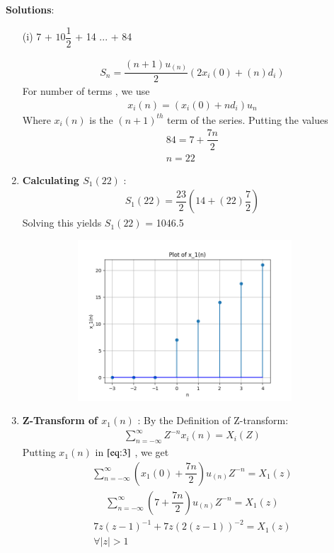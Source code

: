 \documentclass[journal,12pt,twocolumn]{IEEEtran}
\theoremstyle{remark}
\begin{document}
\vspace{0.5cm}
\textbf{Solutions}:
\begin{enumerate}
\item[(i)]   
7 + $10\dfrac{1}{2}$ + 14 ... + 84
\vspace{0.2cm}

\begin{align}
{S_n} = \dfrac{(n+1)u_{(n)}}{2}(2x_i(0) + (n)d_i)\label{eq:1}
\end{align}
For number of terms , we use
\begin{align}
x_i(n) = (x_i(0) + nd_i)u_n\label{eq:2}
\end{align}
Where $x_i(n)$ is the $(n+1)^{th}$ term of the series. Putting the values
\begin{align}  
84 = 7+\dfrac{7n}{2}\\
n=22
\end{align}
\item 
\textbf{Calculating $S_1(22)$} : 
\begin{align}
    S_1{(22)} = \dfrac{23}{2}(14+(22)\dfrac{7}{2})
    \end{align}
Solving this yields $S_1{(22)}$ = 1046.5\vspace{0.05cm}\vspace{0.1cm}

    \begin{figure}[!ht]
    \centering
\graphicspath{ {figs/} }
\includegraphics[width=10cm, height=6cm]{graph_1}
\captionsetup{Graph:1 $x_1(n)$ vs n }
\end{figure}
\vspace{0.05cm}
\item 
\textbf{Z-Transform of $x_1(n)$} :
\vspace{0.2cm}
By the Definition of Z-transform:
\begin{align}
 \sum_{n=-\infty}^{\infty} Z^{-n}x_i(n) = X_i(Z)\label{eq:3}
 \end{align}
\vspace{0.05cm}Putting $x_1(n)$ in $\eqref{eq:3}$ , we get \vspace{0.05cm}
\begin{align}
     \sum_{n=-\infty}^{\infty}(x_1(0) + \dfrac{7n}{2})u_{(n)}Z^{-n} =X_1(z)
\end{align}
\begin{align}
\sum_{n=-\infty}^{\infty}(7 + \dfrac{7n}{2})u_{(n)}Z^{-n} =X_1(z)
\end{align}
\begin{align}
7z(z-1)^{-1}+
7z(2(z-1))^{-2}=X_1(z) \label{eq:4}\\
\forall \lvert z \rvert  >  1 
\end{align}
    

\end{enumerate}
\end{document}
